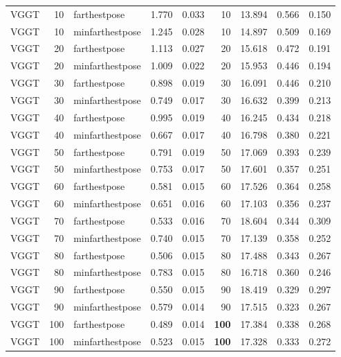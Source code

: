 \begin{table}[H]
\begin{tabular}{lrlrrrrrr}
VGGT & 10 & farthestpose & 1.770 & 0.033 & 10 & 13.894 & 0.566 & 0.150 \\
VGGT & 10 & minfarthestpose & 1.245 & 0.028 & 10 & 14.897 & 0.509 & 0.169 \\
VGGT & 20 & farthestpose & 1.113 & 0.027 & 20 & 15.618 & 0.472 & 0.191 \\
VGGT & 20 & minfarthestpose & 1.009 & 0.022 & 20 & 15.953 & 0.446 & 0.194 \\
VGGT & 30 & farthestpose & 0.898 & 0.019 & 30 & 16.091 & 0.446 & 0.210 \\
VGGT & 30 & minfarthestpose & 0.749 & 0.017 & 30 & 16.632 & 0.399 & 0.213 \\
VGGT & 40 & farthestpose & 0.995 & 0.019 & 40 & 16.245 & 0.434 & 0.218 \\
VGGT & 40 & minfarthestpose & 0.667 & 0.017 & 40 & 16.798 & 0.380 & 0.221 \\
VGGT & 50 & farthestpose & 0.791 & 0.019 & 50 & 17.069 & 0.393 & 0.239 \\
VGGT & 50 & minfarthestpose & 0.753 & 0.017 & 50 & 17.601 & 0.357 & 0.251 \\
VGGT & 60 & farthestpose & 0.581 & 0.015 & 60 & 17.526 & 0.364 & 0.258 \\
VGGT & 60 & minfarthestpose & 0.651 & 0.016 & 60 & 17.103 & 0.356 & 0.237 \\
VGGT & 70 & farthestpose & 0.533 & 0.016 & 70 & 18.604 & 0.344 & 0.309 \\
VGGT & 70 & minfarthestpose & 0.740 & 0.015 & 70 & 17.139 & 0.358 & 0.252 \\
VGGT & 80 & farthestpose & 0.506 & 0.015 & 80 & 17.488 & 0.343 & 0.267 \\
VGGT & 80 & minfarthestpose & 0.783 & 0.015 & 80 & 16.718 & 0.360 & 0.246 \\
VGGT & 90 & farthestpose & 0.550 & 0.015 & 90 & 18.419 & 0.329 & 0.297 \\
VGGT & 90 & minfarthestpose & 0.579 & 0.014 & 90 & 17.515 & 0.323 & 0.267 \\
VGGT & 100 & farthestpose & 0.489 & 0.014 & \textbf{100} & 17.384 & 0.338 & 0.268 \\
VGGT & 100 & minfarthestpose & 0.523 & 0.015 & \textbf{100} & 17.328 & 0.333 & 0.272 \\
\bottomrule
\end{tabular}
\end{table}